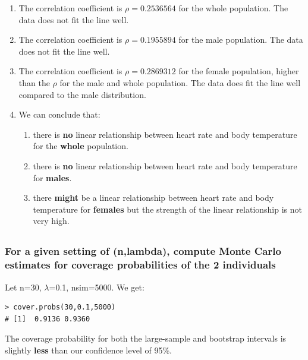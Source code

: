 \documentclass[12pt,letterpaper,titlepage,en-US]{article}
\begin{document}
\begin{enumerate}
\item The correlation coefficient is $\rho=0.2536564$ for the whole population. The data does not fit the line well.

\item The correlation coefficient is $\rho=0.1955894$ for the male population. The data does not fit the line well.

\item The correlation coefficient is $\rho=0.2869312$ for the female population, higher than the $\rho$ for the male and whole population. The data does fit the line well compared to the male distribution.

\item We can conclude that:
\begin{enumerate}
\item there is \textbf{no} linear relationship between heart rate and body temperature for the \textbf{whole} population.
\item  there is \textbf{no} linear relationship between heart rate and body temperature for \textbf{males}.
\item there \textbf{might} be a linear relationship between heart rate and body temperature for \textbf{females} but the strength of the linear relationship is not very high.
\end{enumerate} 
\end{enumerate}


\subsection{}
\subsubsection{For a given setting of (n,lambda), compute Monte Carlo estimates for coverage probabilities of the 2 individuals}
Let n=30, $\lambda$=0.1, nsim=5000. We get:
\begin{knitrout}
\color{fgcolor}
\begin{kframe}
\begin{verbatim}
> cover.probs(30,0.1,5000)
# [1]  0.9136 0.9360
\end{verbatim}
\end{kframe}
\end{knitrout}
The coverage probability for both the large-sample and bootstrap intervals is slightly \textbf{less} than our confidence level of 95\%.
\end{document}

